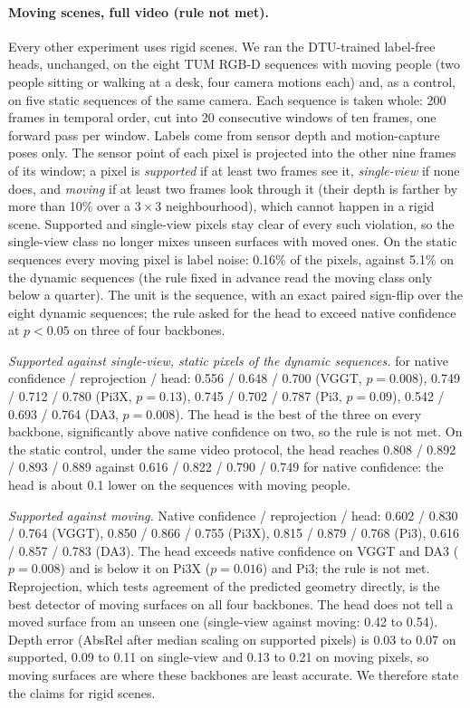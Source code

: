 \paragraph{Moving scenes, full video (rule not met).}
Every other experiment uses rigid scenes. We ran the DTU-trained label-free heads, unchanged, on the eight TUM RGB-D sequences with moving people (two people sitting or walking at a desk, four camera motions each) and, as a control, on five static sequences of the same camera. Each sequence is taken whole: 200 frames in temporal order, cut into 20 consecutive windows of ten frames, one forward pass per window. Labels come from sensor depth and motion-capture poses only. The sensor point of each pixel is projected into the other nine frames of its window; a pixel is \emph{supported} if at least two frames see it, \emph{single-view} if none does, and \emph{moving} if at least two frames look through it (their depth is farther by more than 10\% over a $3\times3$ neighbourhood), which cannot happen in a rigid scene. Supported and single-view pixels stay clear of every such violation, so the single-view class no longer mixes unseen surfaces with moved ones. On the static sequences every moving pixel is label noise: 0.16\% of the pixels, against 5.1\% on the dynamic sequences (the rule fixed in advance read the moving class only below a quarter). The unit is the sequence, with an exact paired sign-flip over the eight dynamic sequences; the rule asked for the head to exceed native confidence at $p<0.05$ on three of four backbones.

\emph{Supported against single-view, static pixels of the dynamic sequences.} \auroc{} for native confidence / reprojection / head: 0.556 / 0.648 / 0.700 (VGGT, $p=0.008$), 0.749 / 0.712 / 0.780 (Pi3X, $p=0.13$), 0.745 / 0.702 / 0.787 (Pi3, $p=0.09$), 0.542 / 0.693 / 0.764 (DA3, $p=0.008$). The head is the best of the three on every backbone, significantly above native confidence on two, so the rule is not met. On the static control, under the same video protocol, the head reaches 0.808 / 0.892 / 0.893 / 0.889 against 0.616 / 0.822 / 0.790 / 0.749 for native confidence: the head is about 0.1 \auroc{} lower on the sequences with moving people.

\emph{Supported against moving.} Native confidence / reprojection / head: 0.602 / 0.830 / 0.764 (VGGT), 0.850 / 0.866 / 0.755 (Pi3X), 0.815 / 0.879 / 0.768 (Pi3), 0.616 / 0.857 / 0.783 (DA3). The head exceeds native confidence on VGGT and DA3 ($p=0.008$) and is below it on Pi3X ($p=0.016$) and Pi3; the rule is not met. Reprojection, which tests agreement of the predicted geometry directly, is the best detector of moving surfaces on all four backbones. The head does not tell a moved surface from an unseen one (single-view against moving: 0.42 to 0.54). Depth error (AbsRel after median scaling on supported pixels) is 0.03 to 0.07 on supported, 0.09 to 0.11 on single-view and 0.13 to 0.21 on moving pixels, so moving surfaces are where these backbones are least accurate. We therefore state the claims for rigid scenes.

